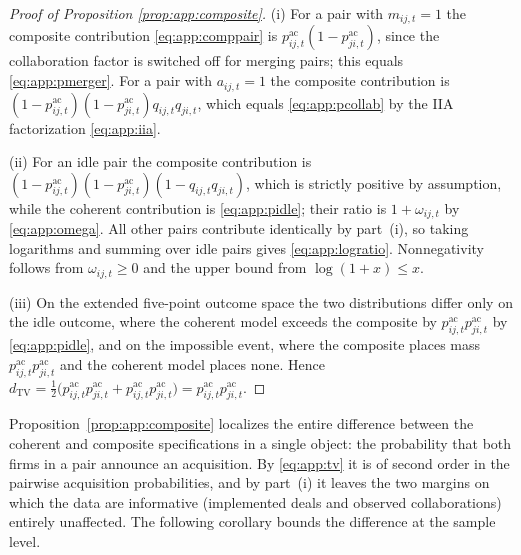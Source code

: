 \begin{proof}[Proof of Proposition \ref{prop:app:composite}]
(i) For a pair with $m_{ij,t}=1$ the composite contribution
\eqref{eq:app:comppair} is $p^{\mathrm{ac}}_{ij,t}(1 -
p^{\mathrm{ac}}_{ji,t})$, since the collaboration factor is switched off
for merging pairs; this equals \eqref{eq:app:pmerger}. For a pair with
$a_{ij,t}=1$ the composite contribution is $(1 -
p^{\mathrm{ac}}_{ij,t})(1 - p^{\mathrm{ac}}_{ji,t}) q_{ij,t} q_{ji,t}$,
which equals \eqref{eq:app:pcollab} by the IIA factorization
\eqref{eq:app:iia}.

(ii) For an idle pair the composite contribution is $(1 -
p^{\mathrm{ac}}_{ij,t})(1 - p^{\mathrm{ac}}_{ji,t})(1 - q_{ij,t}
q_{ji,t})$, which is strictly positive by assumption, while the coherent
contribution is \eqref{eq:app:pidle}; their ratio is $1 +
\omega_{ij,t}$ by \eqref{eq:app:omega}. All other pairs contribute
identically by part~(i), so taking logarithms and summing over idle
pairs gives \eqref{eq:app:logratio}. Nonnegativity follows from
$\omega_{ij,t}\ge 0$ and the upper bound from $\log(1+x)\le x$.

(iii) On the extended five-point outcome space the two distributions
differ only on the idle outcome, where the coherent model exceeds the
composite by $p^{\mathrm{ac}}_{ij,t} p^{\mathrm{ac}}_{ji,t}$ by
\eqref{eq:app:pidle}, and on the impossible event, where the composite
places mass $p^{\mathrm{ac}}_{ij,t} p^{\mathrm{ac}}_{ji,t}$ and the
coherent model places none. Hence $d_{\mathrm{TV}} = \tfrac{1}{2} \bigl(
p^{\mathrm{ac}}_{ij,t} p^{\mathrm{ac}}_{ji,t} +
p^{\mathrm{ac}}_{ij,t} p^{\mathrm{ac}}_{ji,t} \bigr) =
p^{\mathrm{ac}}_{ij,t} p^{\mathrm{ac}}_{ji,t}$.
\end{proof}
Proposition~\ref{prop:app:composite} localizes the entire difference
between the coherent and composite specifications in a single object:
the probability that both firms in a pair announce an acquisition. By
\eqref{eq:app:tv} it is of second order in the pairwise acquisition
probabilities, and by part~(i) it leaves the two margins on which the
data are informative (implemented deals and observed collaborations) entirely unaffected. The following corollary bounds the difference
at the sample level.
